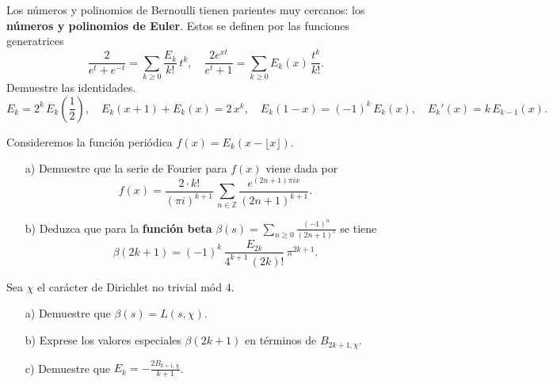 \begin{ejercicio}
  Los números y polinomios de Bernoulli tienen parientes muy cercanos:
  los \textbf{números y polinomios de Euler}. Estos se definen por las funciones
  generatrices
  \[ \frac{2}{e^t + e^{-t}} = \sum_{k \ge 0} \frac{E_k}{k!} \, t^k, \quad
     \frac{2 e^{xt}}{e^t + 1} = \sum_{k \ge 0} E_k (x)\,\frac{t^k}{k!}. \]
  Demuestre las identidades.
  \[ E_k = 2^k \, E_k \left(\frac{1}{2}\right), \quad
     E_k (x+1) + E_k (x) = 2\,x^k, \quad
     E_k (1-x) = (-1)^k\,E_k (x), \quad
     E_k' (x) = k\,E_{k-1} (x). \]
\end{ejercicio}

\begin{ejercicio}[Continuación]
  Consideremos la función periódica $f (x) = E_k (x - \lfloor x\rfloor)$.

  \begin{enumerate}
  \item[a)] Demuestre que la serie de Fourier para $f (x)$ viene dada por
    $$f (x) = \frac{2\cdot k!}{(\pi i)^{k+1}}\,\sum_{n\in \mathbb{Z}} \frac{e^{(2n+1)\pi i x}}{(2n+1)^{k+1}}.$$
  \item[b)] Deduzca que para la \textbf{función beta}
    $\beta (s) = \sum_{n \ge 0} \frac{(-1)^n}{(2n+1)^s}$ se tiene
    $$\beta (2k+1) = (-1)^k\,\frac{E_{2k}}{4^{k+1}\,(2k)!}\,\pi^{2k+1}.$$
  \end{enumerate}
\end{ejercicio}

\begin{ejercicio}[Continuación]
  Sea $\chi$ el carácter de Dirichlet no trivial mód $4$.

  \begin{enumerate}
  \item[a)] Demuestre que $\beta (s) = L (s,\chi)$.

  \item[b)] Exprese los valores especiales $\beta (2k+1)$ en términos de
    $B_{2k+1,\chi}$.

  \item[c)] Demuestre que $E_k = -\frac{2B_{k+1,\chi}}{k+1}$.
  \end{enumerate}
\end{ejercicio}
\fi
